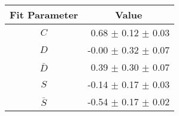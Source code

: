 \begin{tabular}{c r } 
\hline
\hline
Fit Parameter & \multicolumn{1}{c}{Value}  \\ 
\hline
$C$ & 0.68 $\pm$ 0.12 $\pm$ 0.03 \\ 
$D$ & -0.00 $\pm$ 0.32 $\pm$ 0.07 \\ 
$\bar{D}$ & 0.39 $\pm$ 0.30 $\pm$ 0.07 \\ 
$S$ & -0.14 $\pm$ 0.17 $\pm$ 0.03 \\ 
$\bar{S}$ & -0.54 $\pm$ 0.17 $\pm$ 0.02 \\ 
\hline
\hline
\end{tabular}
